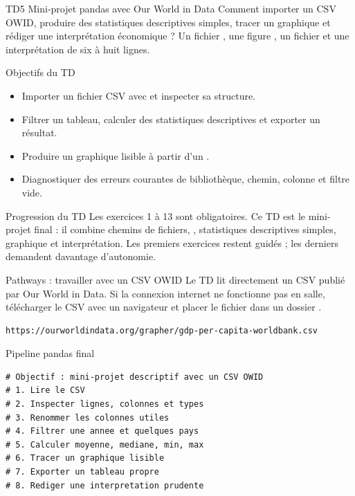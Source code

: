 \documentclass[11pt,a4paper]{article}
\begin{document}
\workbooktitle
  {TD5}
  {Mini-projet pandas avec Our World in Data}
  {Comment importer un CSV OWID, produire des statistiques descriptives simples, tracer un graphique et rédiger une interprétation économique ?}
  {Un fichier , une figure , un fichier  et une interprétation de six à huit lignes.}

\begin{objectivebox}{Objectifs du TD}
\begin{itemize}
  \item Importer un fichier CSV avec  et inspecter sa structure.
  \item Filtrer un tableau, calculer des statistiques descriptives et exporter un résultat.
  \item Produire un graphique lisible à partir d'un .
  \item Diagnostiquer des erreurs courantes de bibliothèque, chemin, colonne et filtre vide.
\end{itemize}
\end{objectivebox}

\begin{checkpointbox}{Progression du TD}
Les exercices 1 à 13 sont obligatoires. Ce TD est le mini-projet final : il combine chemins de fichiers, , statistiques descriptives simples, graphique et interprétation. Les premiers exercices restent guidés ; les derniers demandent davantage d'autonomie.
\end{checkpointbox}

\begin{pathwaybox}{Pathways : travailler avec un CSV OWID}
Le TD lit directement un CSV publié par Our World in Data. Si la connexion internet ne fonctionne pas en salle, télécharger le CSV avec un navigateur et placer le fichier dans un dossier .
\begin{lstlisting}[language=terminal]
https://ourworldindata.org/grapher/gdp-per-capita-worldbank.csv
\end{lstlisting}
\end{pathwaybox}

\begin{pseudocodeexercise}{Pipeline pandas final}
\begin{lstlisting}
# Objectif : mini-projet descriptif avec un CSV OWID
# 1. Lire le CSV
# 2. Inspecter lignes, colonnes et types
# 3. Renommer les colonnes utiles
# 4. Filtrer une annee et quelques pays
# 5. Calculer moyenne, mediane, min, max
# 6. Tracer un graphique lisible
# 7. Exporter un tableau propre
# 8. Rediger une interpretation prudente
\end{lstlisting}
\end{pseudocodeexercise}
\end{document}
